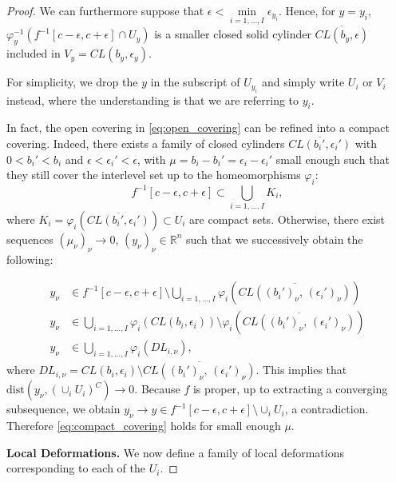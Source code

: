 \documentclass[11pt]{article}
\newcommand{\R}{\mathbb{R}}
\newcommand{\eps}{\epsilon}
\newcommand{\inter}{\cap}
\newcommand{\union}{\cup}
\newcommand{\dist}{\mathrm{dist}}
\theoremstyle{plain}
\theoremstyle{definition}
\theoremstyle{remark}
\begin{document}
\begin{proof}
		We can furthermore suppose that $\eps < \min\limits_{i = 1, \ldots, I} \eps_{y_i}$. Hence, for $y = y_i$, $\varphi_{y}^{-1}( f^{-1}[c-\eps, c+ \eps] \inter U_{y})$ is a smaller closed solid cylinder $\overline{CL(b_y, \eps)}$ included in $V_y = CL(b_y, \eps_y)$.
		
		For simplicity, we drop the $y$ in the subscript of $U_{y_i}$ and simply write $U_i$ or $V_i$ instead, where the understanding is that we are referring to $y_i$.
		
		In fact, the open covering in \eqref{eq:open_covering} can be refined into a compact covering. Indeed, there exists a family of closed cylinders $\overline{CL(b_i', \eps_i')}$ with $0 < b_i' < b_i$ and $\eps < \eps_i' < \eps$, with $\mu = b_i - b_i' = \eps_i - \eps_i'$ small enough such that they still cover the interlevel set up to the homeomorphisms $\varphi_i$:
		\begin{equation}
			\label{eq:compact_covering}
			f^{-1}[c-\eps, c+ \eps] \subset \bigcup\limits_{i = 1, \ldots, I} K_i,
		\end{equation}
		where $K_i = \varphi_i(\overline{CL(b_i', \eps_i')}) \subset U_i$ are compact sets.
		Otherwise, there exist sequences $(\mu_\nu)_\nu \to 0$, $(y_\nu)_\nu \in \R^n$ such that we successively obtain the following:
		
		\begin{align*}
			y_\nu &\in f^{-1}[c-\eps, c+ \eps] \setminus \bigcup\limits_{i = 1, \ldots, I} \varphi_i(\overline{CL((b_i')_\nu,\, (\eps_i')_\nu)}) \\
			y_\nu &\in \bigcup\limits_{i = 1, \ldots, I} \varphi_i(CL(b_i, \eps_i)) \setminus \varphi_i(\overline{CL((b_i')_\nu,\,  (\eps_i')_\nu)})\\
			y_\nu &\in \bigcup\limits_{i = 1, \ldots, I} \varphi_i(DL_{i, \nu}),
		\end{align*}
		where $DL_{i, \nu} = CL(b_i, \eps_i) \setminus \overline{CL((b_i')_\nu,\,  (\eps_i')_\nu)}$. This implies that $\dist(y_\nu, (\union_i U_i)^C) \to 0$.
		Because $f$ is proper, up to extracting a converging subsequence, we obtain $y_\nu \to y \in f^{-1}[c-\eps, c+ \eps] \setminus \union_i U_i$, a contradiction. Therefore \eqref{eq:compact_covering} holds for small enough $\mu$.
		
		\textbf{Local Deformations.}
		We now define a family of local deformations corresponding to each of the $U_{i}$.
		

\end{proof}
\end{document}
